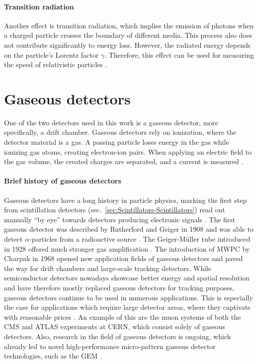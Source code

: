 \paragraph{Transition radiation}
Another effect is transition radiation, which implies the emission of photons when a charged particle crosses the boundary of different media. This process also does not contribute significantly to energy loss. However, the radiated energy depends on the particle's Lorentz factor $\gamma$. Therefore, this effect can be used for measuring the speed of relativistic particles \cite{Book-KolanoskiWermes,PDG2024}.








\FloatBarrier
\section{Gaseous detectors}
\label{sec:GaseousDetectors}
One of the two detectors used in this work is a gaseous detector, more specifically, a drift chamber. Gaseous detectors rely on ionization, where the detector material is a gas. A passing particle loses energy in the gas while ionizing gas atoms, creating electron-ion pairs. When applying an electric field to the gas volume, the created charges are separated, and a current is measured \cite{Book-KolanoskiWermes}.
\paragraph{Brief history of gaseous detectors}
Gaseous detectors have a long history in particle physics, marking the first step from scintillation detectors (sec.\ \ref{sec:Scintillators-Scintillators}) read out manually \enquote{by eye} towards detectors producing electronic signals \cite{GaseousDetectors-HilkeRiegler}. The first gaseous detector was described by Rutherford and Geiger in 1908 and was able to detect $\alpha$-particles from a radioactive source \cite{GaseousDetectors-RutherfordGeiger}. The Geiger-Müller tube introduced in 1928 offered much stronger gas amplification \cite{GaseousDetectors-GeigerMüller}. The introduction of \ac{MWPC} by Charpak in 1968 opened new application fields of gaseous detectors \cite{GaseousDetectors-Charpak} and paved the way for drift chambers and large-scale tracking detectors. While semiconductor detectors nowadays showcase better energy and spatial resolution and have therefore mostly replaced gaseous detectors for tracking purposes, gaseous detectors continue to be used in numerous applications. This is especially the case for applications which require large detector areas, where they captivate with reasonable prices \cite{Book-KolanoskiWermes}. An example of this are the muon systems of both the \acs{CMS} \cite{CMS-Main} and \acs{ATLAS} \cite{ATLAS-Main} experiments at \acs{CERN}, which consist solely of gaseous detectors. Also, research in the field of gaseous detectors is ongoing, which already led to novel high-performance micro-pattern gaseous detector technologies, such as the \ac{GEM} \cite{GaseousDetectors-HilkeRiegler}.

